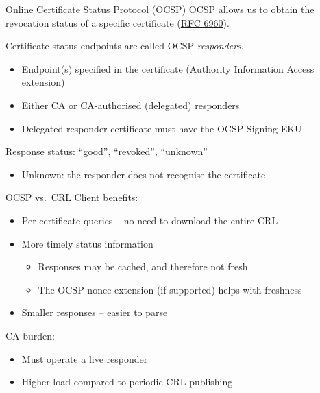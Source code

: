 \begin{frame}{Online Certificate Status Protocol (OCSP)}
  OCSP allows us to obtain the revocation status of a specific certificate (\href{https://datatracker.ietf.org/doc/html/rfc6960}{RFC 6960}).

  \vspace*{0.5em}

  \pause
  Certificate status endpoints are called OCSP \emph{responders}.
  \begin{itemize}[<+(1)->]
    \item Endpoint(s) specified in the certificate (Authority Information Access extension)
    \item Either CA or CA-authorised (delegated) responders
    \item Delegated responder certificate must have the OCSP Signing EKU
  \end{itemize}

  \vspace*{0.5em}

  \pause
  Response status: \enquote{good}, \enquote{revoked}, \enquote{unknown}
  \begin{itemize}[<+(1)->]
    \item Unknown: the responder does not recognise the certificate
  \end{itemize}
\end{frame}

\begin{frame}{OCSP vs.\ CRL}
  Client benefits:
  \begin{itemize}[<+(1)->]
    \item Per-certificate queries -- no need to download the entire CRL
    \item More timely status information
    \begin{itemize}
      \item Responses may be cached, and therefore not fresh
      \item The OCSP nonce extension (if supported) helps with freshness
    \end{itemize}
    \item Smaller responses -- easier to parse
  \end{itemize}

  \vspace*{0.5em}

  \pause
  CA burden:
  \begin{itemize}[<+(1)->]
    \item Must operate a live responder
    \item Higher load compared to periodic CRL publishing
  \end{itemize}
\end{frame}

